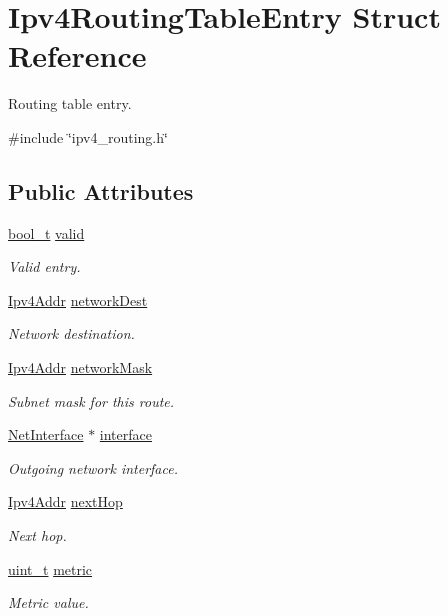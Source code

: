 \hypertarget{structIpv4RoutingTableEntry}{}\section{Ipv4\+Routing\+Table\+Entry Struct Reference}
\label{structIpv4RoutingTableEntry}


Routing table entry.  




{\ttfamily \#include \char`\"{}ipv4\+\_\+routing.\+h\char`\"{}}

\subsection*{Public Attributes}
\begin{DoxyCompactItemize}
\item 
\hyperlink{compiler__port_8h_a812d16e5494522586b3784e55d479912}{bool\+\_\+t} \hyperlink{structIpv4RoutingTableEntry_a93b4bd84e83e9f3e0dc9eb71b59708c6}{valid}
\begin{DoxyCompactList}\small\item\em Valid entry. \end{DoxyCompactList}\item 
\hyperlink{ipv4_8h_a411debb3d770caa0c06d3f73367da37f}{Ipv4\+Addr} \hyperlink{structIpv4RoutingTableEntry_a1c041064a846ea939cf5af2dce900c26}{network\+Dest}
\begin{DoxyCompactList}\small\item\em Network destination. \end{DoxyCompactList}\item 
\hyperlink{ipv4_8h_a411debb3d770caa0c06d3f73367da37f}{Ipv4\+Addr} \hyperlink{structIpv4RoutingTableEntry_aac448d5de06b37fb0e4bde56f4f25dcb}{network\+Mask}
\begin{DoxyCompactList}\small\item\em Subnet mask for this route. \end{DoxyCompactList}\item 
\hyperlink{net_8h_a2234db8911a1148c9159979d8f5e0d6b}{Net\+Interface} $\ast$ \hyperlink{structIpv4RoutingTableEntry_a8ce76307907c9a83061e9013d52d5747}{interface}
\begin{DoxyCompactList}\small\item\em Outgoing network interface. \end{DoxyCompactList}\item 
\hyperlink{ipv4_8h_a411debb3d770caa0c06d3f73367da37f}{Ipv4\+Addr} \hyperlink{structIpv4RoutingTableEntry_a3b3ebf0476ac590ebe1d93dfe727fecb}{next\+Hop}
\begin{DoxyCompactList}\small\item\em Next hop. \end{DoxyCompactList}\item 
\hyperlink{compiler__port_8h_a12a1e9b3ce141648783a82445d02b58d}{uint\+\_\+t} \hyperlink{structIpv4RoutingTableEntry_a26bead504f303ef1a599b0baa26ecd8d}{metric}
\begin{DoxyCompactList}\small\item\em Metric value. \end{DoxyCompactList}\end{DoxyCompactItemize}


